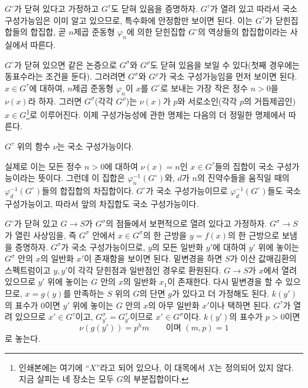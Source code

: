 $G^\circ$가 닫혀 있다고 가정하고 $G^\tau$도 닫혀 있음을 증명하자.
$G^\tau$가 열려 있고 따라서 국소 구성가능임은 이미 알고 있으므로,
특수화에 안정함만 보이면 된다. 이는 $G^\tau$가 닫힌집합들의 합집합,
곧 $n$제곱 준동형 $\varphi_n$에 의한 닫힌집합 $G^\circ$의 역상들의
합집합이라는 사실에서 따른다.

$G^\circ$가 닫혀 있으면 같은 논증으로 $G^\sigma$와 $G^\rho$도 닫혀
있음을 보일 수 있다(첫째 경우에는 동표수라는 조건을 둔다). 그러려면
$G^\sigma$와 $G^\rho$가 국소 구성가능임을 먼저 보이면 된다.
$x\in G^\tau$에 대하여, $n$제곱 준동형 $\varphi_n$이 $x$를
$G^\circ$로 보내는 가장 작은 정수 $n>0$을 $\nu(x)$라 하자. 그러면
$G^\sigma$(각각 $G^\rho$)는 $\nu(x)$가 $p$와 서로소인(각각 $p$의
거듭제곱인) $x\in G$\footnote{인쇄본에는 여기에 ``$X$''라고 되어 있으나,
이 대목에서 $X$는 정의되어 있지 않다. 지금 살피는 네 장소는 모두
$G$의 부분집합이다.}로 이루어진다. 이제 구성가능성에 관한 명제는 다음의
더 정밀한 명제에서 따른다.

 $G^\tau$ 위의 함수 $\nu$는 국소 구성가능이다.

실제로 이는 모든 정수 $n>0$에 대하여 $\nu(x)=n$인 $x\in G^\tau$들의
집합이 국소 구성가능이라는 뜻이다. 그런데 이 집합은
$\varphi_n^{-1}(G^\circ)$와, $d$가 $n$의 진약수들을 움직일 때의
$\varphi_d^{-1}(G^\circ)$들의 합집합의 차집합이다. $G^\circ$가 국소
구성가능이므로 $\varphi_d^{-1}(G^\circ)$들도 국소 구성가능이고, 따라서
앞의 차집합도 국소 구성가능이다.

$G^\circ$가 닫혀 있고 $G\longrightarrow S$가 $G^\sigma$의 점들에서
보편적으로 열려 있다고 가정하자. $G^\sigma\longrightarrow S$가 열린
사상임을, 즉 $G^\sigma$ 안에서 $x\in G^\sigma$의 한 근방을
$y=f(x)$의 한 근방으로 보냄을 증명하자. $G^\sigma$가 국소
구성가능이므로, $y$의 모든 일반화 $y'$에 대하여 $y'$ 위에 놓이는
$G^\sigma$ 안의 $x$의 일반화 $x'$이 존재함을 보이면 된다. 밑변경을
하면 $S$가 이산 값매김환의 스펙트럼이고 $y,y'$이 각각 닫힌점과
일반점인 경우로 환원된다. $G\longrightarrow S$가 $x$에서 열려 있으므로
$y'$ 위에 놓이는 $G$ 안의 $x$의 일반화 $x_1$이 존재한다. 다시 밑변경을
할 수 있으므로, $x=g(y)$를 만족하는 $S$ 위의 $G$의 단면 $g$가 있다고
더 가정해도 된다. $k(y')$의 표수가 0이면 $y'$ 위에 놓이는 $G$ 안의
$x$의 아무 일반화 $x'$이나 택하면 된다. $G^\tau$가 열려 있으므로
$x'\in G^\tau$이고, $G_{y'}^\sigma=G_{y'}^\tau$이므로
$x'\in G^\sigma$이다. $k(y')$의 표수가 $p>0$이면
\[
\nu(g(y'))=p^hm\qquad\text{이며 }(m,p)=1
\]
로 놓는다.


